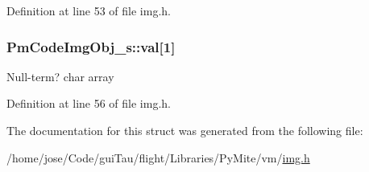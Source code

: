 Definition at line 53 of file img.\-h.

\hypertarget{struct_pm_code_img_obj__s_a9cb26fc90b348ecb2615f2b6cf196994}{
\subsubsection[{val}]{ Pm\-Code\-Img\-Obj\-\_\-s\-::val\mbox{[}1\mbox{]}}}\label{struct_pm_code_img_obj__s_a9cb26fc90b348ecb2615f2b6cf196994}
Null-\/term? char array 

Definition at line 56 of file img.\-h.



The documentation for this struct was generated from the following file\-:\begin{DoxyCompactItemize}
\item 
/home/jose/\-Code/gui\-Tau/flight/\-Libraries/\-Py\-Mite/vm/\hyperlink{img_8h}{img.\-h}\end{DoxyCompactItemize}
